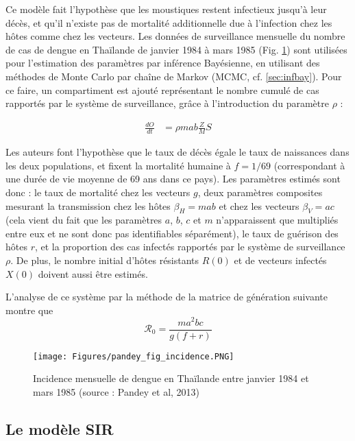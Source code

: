 Ce modèle fait l'hypothèse que les moustiques restent infectieux jusqu'à leur décès, et qu'il n'existe pas de mortalité additionnelle due à l'infection chez les hôtes comme chez les vecteurs.
Les données de surveillance mensuelle du nombre de cas de dengue en Thaïlande de janvier 1984 à mars 1985 (Fig. \ref{fig:pandey_figure_incidence}) sont utilisées pour l'estimation des paramètres par inférence Bayésienne, en utilisant des méthodes de Monte Carlo par chaîne de Markov (MCMC, cf. \ref{sec:infbay}).
Pour ce faire, un compartiment est ajouté représentant le nombre cumulé de cas rapportés par le système de surveillance, grâce à l'introduction du paramètre $\rho$ :

\begin{align}
\frac{dO}{dt} &= \rho mab\frac{Z}{M}S
\end{align}

Les auteurs font l'hypothèse que le taux de décès égale le taux de naissances dans les deux populations, et fixent la mortalité humaine à $f=1/69$ (correspondant à une durée de vie moyenne de 69 ans dans ce pays).
Les paramètres estimés sont donc : le taux de mortalité chez les vecteurs $g$, deux paramètres composites mesurant la transmission chez les hôtes $\beta_H=mab$ et chez les vecteurs $\beta_V=ac$ (cela vient du fait que les paramètres $a$, $b$, $c$ et $m$ n'apparaissent que multipliés entre eux et ne sont donc pas identifiables séparément), le taux de guérison des hôtes $r$, et la proportion des cas infectés rapportés par le système de surveillance $\rho$.
De plus, le nombre initial d'hôtes résistants $R(0)$ et de vecteurs infectés $X(0)$ doivent aussi être estimés.




L'analyse de ce système par la méthode de la matrice de génération suivante montre que 
\begin{equation}
\mathcal{R}_0 = \frac{ma^2bc}{g(f+r)}
\end{equation}


\begin{figure}[h]
	\centering
	\texttt{[image: Figures/pandey\_fig\_incidence.PNG]}
	\caption{Incidence mensuelle de dengue en Thaïlande entre janvier 1984 et mars 1985 (source : Pandey et al, 2013)}
	\label{fig:pandey_figure_incidence}
\end{figure}




\subsection{Le modèle SIR}


